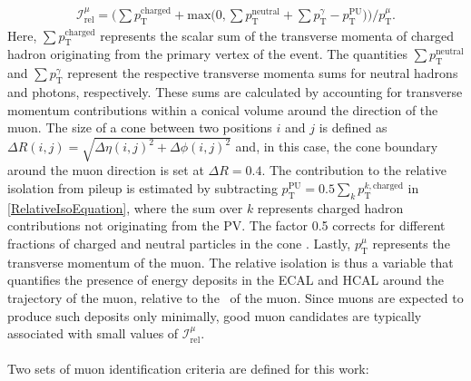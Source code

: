 \begin{align}
    \mathcal{I}^{\mu}_{\mathrm{rel}} = \bigg( \sum p_{\mathrm{T}}^{\mathrm{charged}} + \mathrm{max}\big(0, \sum p_{\mathrm{T}}^{\mathrm{neutral}} + \sum p_{\mathrm{T}}^{\gamma} - p_{\mathrm{T}}^{\mathrm{PU}}\big) \bigg) / p^{\mu}_{\mathrm{T}}. \label{RelativeIsoEquation}
\end{align}
Here, $\sum p_{\mathrm{T}}^{\mathrm{charged}}$ represents the scalar sum of the transverse momenta of charged hadron originating from the primary vertex of the event. The quantities $\sum p_{\mathrm{T}}^{\mathrm{neutral}}$ and $\sum p_{\mathrm{T}}^{\gamma}$ represent the respective transverse momenta sums for neutral hadrons and photons, respectively. These sums are calculated by accounting for transverse momentum contributions within a conical volume around the direction of the muon. The size of a cone between two positions $i$ and $j$ is defined as $\Delta R(i,j) = \sqrt{\Delta\eta(i,j)^2 + \Delta\phi(i,j)^2}$ and, in this case, the cone boundary around the muon direction is set at $\Delta R=0.4$. The contribution to the relative isolation from pileup is estimated by subtracting $p_{\mathrm{T}}^{\mathrm{PU}} = 0.5 \sum_k p_{\mathrm{T}}^{k, \mathrm{charged}}$ in \autoref{RelativeIsoEquation}, where the sum over $k$ represents charged hadron contributions not originating from the PV. The factor 0.5 corrects for different fractions of charged and neutral particles in the cone \cite{CMSPileUpMitigation}. Lastly, $p^{\mu}_{\mathrm{T}}$ represents the transverse momentum of the muon. The relative isolation is thus a variable that quantifies the presence of energy deposits in the ECAL and HCAL around the trajectory of the muon, relative to the \pt \, of the muon. Since muons are expected to produce such deposits only minimally, good muon candidates are typically associated with small values of $\mathcal{I}^{\mu}_{\mathrm{rel}}$.\\
\\
Two sets of muon identification criteria are defined for this work:

